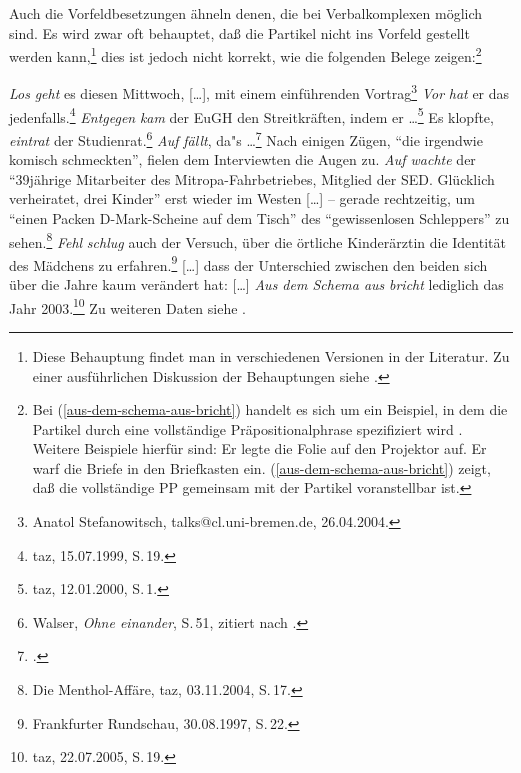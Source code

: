 Auch die Vorfeldbesetzungen ähneln denen, die bei Verbalkomplexen
möglich sind. Es wird zwar oft behauptet, daß die Partikel nicht ins Vorfeld gestellt werden kann,\footnote{
  Diese Behauptung findet man in verschiedenen Versionen in der Literatur. Zu einer
  ausführlichen Diskussion der Behauptungen siehe .%
} dies ist jedoch nicht korrekt, wie die folgenden Belege zeigen:\footnote{
Bei (\ref{aus-dem-schema-aus-bricht}) handelt es sich um ein Beispiel, in dem
die Partikel durch eine vollständige Präpositionalphrase spezifiziert wird \citep{Olsen97a,Olsen99a}.
Weitere Beispiele hierfür sind:
\eal
\ex Er legte die Folie auf den Projektor auf.
\ex Er warf die Briefe in den Briefkasten ein.
\zl 
(\ref{aus-dem-schema-aus-bricht}) zeigt, daß die vollständige PP gemeinsam mit der Partikel voranstellbar ist.%
}

\eal
\label{bsp-partikel-fronting}
\ex \emph{Los} \emph{geht} es diesen Mittwoch, [\ldots], mit einem einführenden Vortrag\footnote{
  Anatol Stefanowitsch, talks@cl.uni-bremen.de, 26.04.2004.
}
\ex
\label{bsp-vor-hat-er-das}
\emph{Vor\/} \emph{hat\/} er das jedenfalls.\footnote{
taz, 15.07.1999, S.\,19.
}
\ex \emph{Entgegen\/} \emph{kam\/} der EuGH den Streitkräften, indem er \ldots{}\footnote{
taz, 12.01.2000, S.\,1.}
\ex Es klopfte, \emph{eintrat\/} der Studienrat.\footnote{
Walser, \emph{Ohne einander}, S.\,51, zitiert nach .
}
\ex\label{bsp-auf-faellt}
\emph{Auf\/}  \emph{fällt\/}, da"s \ldots{}\footnote{
  .
}
\ex\label{bsp-auf-wachte}
Nach einigen Zügen, "`die irgendwie komisch schmeckten"', fielen dem Interviewten die Augen zu. 
\emph{Auf wachte} der "`39jährige Mitarbeiter des Mitropa-Fahrbetriebes, Mitglied der SED. Glücklich verheiratet, drei Kinder"'
erst %
wieder im Westen [\ldots] -- gerade rechtzeitig, um "`einen Packen D-Mark-Scheine auf dem Tisch"' 
des "`gewissenlosen Schleppers"' zu sehen.\footnote{
  Die Menthol-Affäre, taz, 03.11.2004, S.\,17.
}
\ex \emph{Fehl} \emph{schlug} auch der Versuch, über die örtliche Kinderärztin die Identität des Mädchens zu erfahren.\footnote{
  Frankfurter Rundschau, 30.08.1997, S.\,22.
}
\ex\label{aus-dem-schema-aus-bricht}
{}[\ldots] dass der Unterschied zwischen den beiden sich über die Jahre kaum verändert hat: [\ldots]
    \emph{Aus dem Schema aus} \emph{bricht} lediglich das Jahr 2003.\footnote{
    taz, 22.07.2005, S.\,19.
}
\zl
Zu weiteren Daten siehe .



